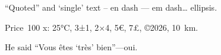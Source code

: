 \documentclass{article}
\begin{document}
“Quoted” and ‘single’ text – en dash — em dash… ellipsis.

Price 100 x: 25°C, 3±1, 2×4, 5€, 7£, ©2026, 10 km.

He said “Vous êtes ‘très’ bien”—oui.
\end{document}
